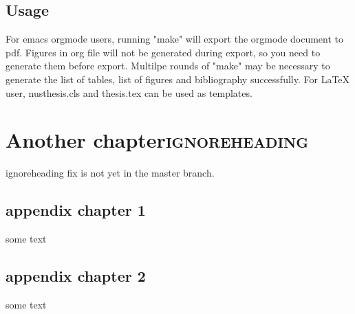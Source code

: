 \documentclass{nusthesis}
\begin{document}
\section{Usage}
\label{sec-2-2}
For emacs orgmode users, running "make" will export the orgmode document to pdf. Figures in org file will not be generated during export, so you need to generate them before export.
Multilpe rounds of "make" may be necessary to generate the list of tables, list of figures and bibliography successfully.
For \LaTeX{} user, nusthesis.cls and thesis.tex can be used as templates.
\chapter[Another chapter]{Another chapter\hfill{}\textsc{ignoreheading}}
\label{sec-3}
ignoreheading fix is not yet in the master branch.

\newpage



\newpage
\appendix
\addappheadtotoc
\appendixpage

\section{appendix chapter 1}
\label{sec-3-1}
some text

\section{appendix chapter 2}
\label{sec-3-2}
some text
\end{document}
